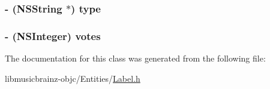 \hypertarget{interface_label_a39681f294f4f2e3a9ff0ef26c0defaa8}{
\subsubsection[{type}]{\setlength{\rightskip}{0pt plus 5cm}-\/ (N\-S\-String $\ast$) {\bf type}}}\label{interface_label_a39681f294f4f2e3a9ff0ef26c0defaa8}
\hypertarget{interface_label_a59de345af4c1d302b04ad1205e5ab5b6}{
\subsubsection[{votes}]{\setlength{\rightskip}{0pt plus 5cm}-\/ (N\-S\-Integer) {\bf votes}}}\label{interface_label_a59de345af4c1d302b04ad1205e5ab5b6}


The documentation for this class was generated from the following file\-:\begin{DoxyCompactItemize}
\item 
libmusicbrainz-\/objc/\-Entities/\hyperlink{_label_8h}{Label.\-h}\end{DoxyCompactItemize}
